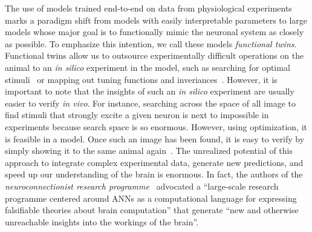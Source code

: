 \documentclass[B2,COG]{ercgrant}
\begin{document}
The use of models trained end-to-end on data from physiological experiments marks a paradigm shift from models with easily interpretable parameters to large models whose major goal is to functionally mimic the neuronal system as closely as possible.
To emphasize this intention, we call these models \textit{functional twins}. 
Functional twins allow us to outsource experimentally difficult operations on the animal to an \textit{in silico} experiment in the model, such as searching for optimal stimuli~\parencite{Walker2019-yw} or mapping out tuning functions and inveriances~\parencite{Baroni2022-fi}. 
However, it is important to note that the insights of such an \textit{in silico} experiment are usually easier to verify \textit{in vivo}. 
For instance, searching across the space of all image to find stimuli that strongly excite a given neuron is next to impossible in experiments because search space is so enormous.
However, using optimization, it is feasible in a model.
Once such an image has been found, it is easy to verify by simply showing it to the same animal again~\parencite{Walker2019-yw,Bashivan2019-ry}.
The unrealized potential of this approach to integrate complex experimental data, generate new predictions, and speed up our understanding of the brain is enormous. 
In fact, the authors of the \textit{neuroconnectionist research programme}~\parencite{Doerig2022-ex} advocated a ``large-scale research programme centered around ANNs as a computational language for expressing falsifiable theories about brain computation'' that generate ``new and otherwise unreachable insights into the workings of the brain''. 

\end{document}
